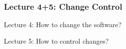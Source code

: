 \subsubsection{Lecture 4+5: Change Control}
\begin{frame}[2]{Lecture 4: How to change the software?}
	\slideEvolutionAndMaintenance
\end{frame}
\begin{frame}{Lecture 5: How to control changes?}
	\centering{}
\end{frame}

%	
